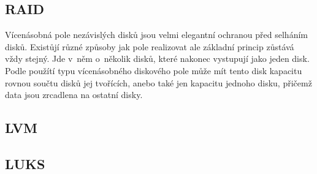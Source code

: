 \documentclass[color,table,oneside,nolot,nolof]{fithesis}
\begin{document}
\subsection{RAID}
	Vícenásobná pole nezávislých disků jsou velmi elegantní ochranou před selháním disků. Existůjí různé způsoby jak pole realizovat ale základní princip zůstává vždy stejný. Jde v~něm
	o~několik disků, které nakonec vystupují jako jeden disk. Podle použítí typu vícenásobného diskového pole může mít tento disk kapacitu rovnou součtu disků jej tvořících, anebo také
	jen kapacitu jednoho disku, přičemž data jsou zrcadlena na ostatní disky.

\subsection{LVM}

\subsection{LUKS}

















	\printbibliography
\end{document}
